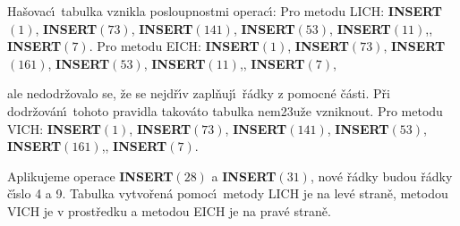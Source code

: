 \flushpar Ha\v sovac\'\i\ tabulka vznikla posloupnostmi operac\'\i :\newline 
Pro metodu LICH:\newline 
{\bf INSERT$\left(1\right)$}, {\bf INSERT$\left(73\right)$}, {\bf INSERT$\left(141\right)$}, 
{\bf INSERT$\left(53\right)$}, {\bf INSERT$\left(11\right)$},, {\bf INSERT$
\left(7\right)$}.\newline 
Pro metodu EICH:\newline 
{\bf INSERT$\left(1\right)$}, {\bf INSERT$\left(73\right)$}, {\bf INSERT$\left(161\right)$}, 
{\bf INSERT$\left(53\right)$}, {\bf INSERT$\left(11\right)$},, {\bf INSERT$
\left(7\right)$},

\flushpar ale nedodr\v zovalo se, \v ze se nejd\v r\'\i v zapl\v nuj\'\i\ \v r\'adky z 
pomocn\'e \v c\'asti.  P\v ri dodr\v zov\'an\'\i\ tohoto pravidla takov\'ato tabulka 
nem\accent23u\v ze vznik\-nout.\newline 
Pro metodu VICH:\newline 
{\bf INSERT$\left(1\right)$}, {\bf INSERT$\left(73\right)$}, {\bf INSERT$\left(141\right)$}, 
{\bf INSERT$\left(53\right)$}, {\bf INSERT$\left(161\right)$},, {\bf INSERT$\left(7\right)$}. 

\flushpar Aplikujeme operace {\bf INSERT$\left(28\right)$} a {\bf INSERT$\left(31
\right)$}, nov\'e \v r\'ad\-ky 
budou \v r\'adky \v c\'\i slo 4 a 9. Tabulka vytvo\v ren\'a pomoc\'\i\ 
metody LICH je na lev\'e stran\v e, metodou VICH je v 
prost\v redku a metodou EICH je na prav\'e stran\v e.

